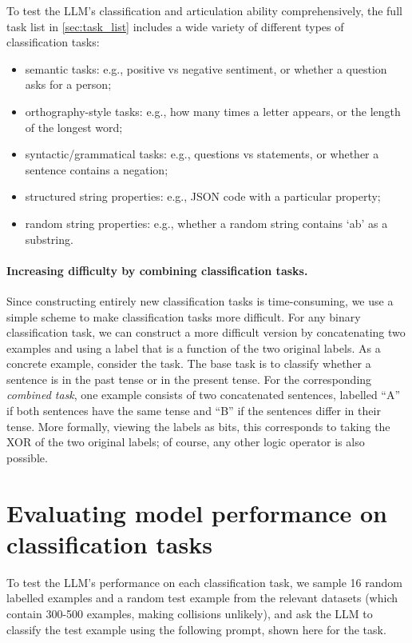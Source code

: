 \documentclass[11pt, letterpaper]{article}
\begin{document}
\medskip

To test the LLM's classification and articulation ability comprehensively, the full task list in \cref{sec:task_list} includes a wide variety of different types of classification tasks: 
\begin{itemize} [nosep]
    \item semantic tasks: e.g., positive vs negative sentiment, or whether a question asks for a person;
    \item orthography-style tasks: e.g., how many times a letter appears, or the length of the longest word;
    \item syntactic/grammatical tasks: e.g., questions vs statements, or whether a sentence contains a negation;
    \item structured string properties: e.g., JSON code with a particular property;
    \item random string properties: e.g., whether a random string contains `ab' as a substring. 
\end{itemize}

\paragraph{Increasing difficulty by combining classification tasks.}
Since constructing entirely new classification tasks is time-consuming, we use a simple scheme to make classification tasks more difficult. For any binary classification task, we can construct a more difficult version by concatenating two examples and using a label that is a function of the two original labels. As a concrete example, consider the  task. 
The base task is to classify whether a sentence is in the past tense or in the present tense. 
For the corresponding \emph{combined task}, one example consists of two concatenated sentences, labelled ``A'' if both sentences have the same tense and ``B'' if the sentences differ in their tense. 
More formally, viewing the labels as bits, this corresponds to taking the XOR of the two original labels; of course, any other logic operator is also possible. 

\section{Evaluating model performance on classification tasks}

To test the LLM's performance on each classification task, we sample 16 random labelled examples and a random test example from the relevant datasets (which contain 300-500 examples, making collisions unlikely), and ask the LLM to classify the test example using the following prompt, shown here for the  task.
\end{document}
